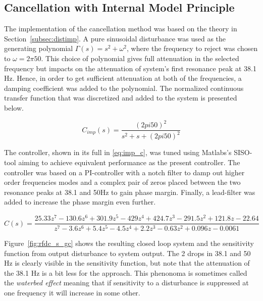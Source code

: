 \FloatBarrier
\subsection{Cancellation with Internal Model Principle}
The implementation of the \abbrIMP cancellation method was based on the theory in Section~\ref{subsec:distimp}. A pure sinusoidal disturbance was used as the generating polynomial $\Gamma(s) = s^2 + \omega^2$, where the frequency to reject was chosen to $\omega = 2\pi50$. This choice of polynomial gives full attenuation in the selected frequency but impacts on the attenuation of system's first resonance peak at 38.1 Hz. Hence, in order to get sufficient attenuation at both of the frequencies, a damping coefficient was added to the polynomial. The normalized continuous transfer function that was discretized and added to the system is presented below.

\begin{equation}
  C_{imp}(s) = \frac{(2pi50)^2}{s^2 + s + (2pi50)^2}
\end{equation}

The controller, shown in its full in \eqref{eq:imp_c}, was tuned using Matlabs's SISO-tool aiming to achieve equivalent performance as the present controller. The controller was based on a PI-controller with a notch filter to damp out higher order frequencies modes and a complex pair of zeros placed between the two resonance peaks at 38.1 and 50Hz to gain phase margin. Finally, a lead-filter was added to increase the phase margin even further.

\begin{equation}
  \label{eq:imp_c}
  C(s) = \frac{25.33z^7 - 130.6z^6 + 301.9z^5 - 429z^4 + 424.7z^3 - 291.5z^2 + 121.8z - 22.64}{z^7 - 3.6z^6 + 5.4z^5 - 4.5z^4 + 2.2z^3 - 0.63z^2 + 0.096z - 0.0061}
\end{equation}




Figure~\ref{fig:rfdc_s_gc} shows the resulting closed loop system and the sensitivity function from output disturbance to system output. The 2 drops in 38.1 and 50 Hz is clearly visible in the sensitivity function, but note that the attenuation of the 38.1 Hz is a bit less for the \abbrIMP approach. This phenonoma is sometimes called the \emph{waterbed effect} meaning that if sensitivity to a disturbance is suppressed at one frequency it will increase in some other.

